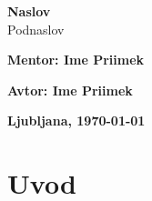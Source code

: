 \documentclass[12pt, a4paper]{article}
\begin{document}
\thispagestyle{empty}

\begin{figure}
  \centering
  \def\svgwidth{\columnwidth}
  \vspace{50mm}
\end{figure}

\begin{center}
  
  \huge \textbf{Naslov} \\
  \LARGE Podnaslov

\end{center}

\vfill

\begin{minipage}{6cm}
  \textbf{Mentor: Ime Priimek}
\end{minipage}
  \hfill
\begin{minipage}{6cm}
  \textbf{Avtor: Ime Priimek}
\end{minipage}

\begin{center}
  \textbf{Ljubljana, \today}
\end{center}

\newpage

\tableofcontents

\listoffigures

\listoftables

\newpage

\section{Uvod}
\end{document}
